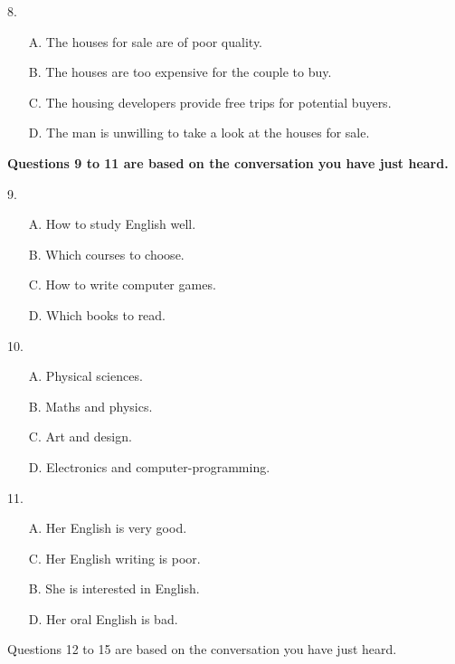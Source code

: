 \documentclass[UTF8,11pt]{ctexart}
\begin{document}
8.


\begin{itemize}[leftmargin=2em,itemsep=.2em,topsep=.4em]\item[A.] The houses for sale are of poor quality.
\item[B.] The houses are too expensive for the couple to buy.
\item[C.] The housing developers provide free trips for potential buyers.
\item[D.] The man is unwilling to take a look at the houses for sale.
\end{itemize}

\textbf{Questions 9 to 11 are based on the conversation you have just heard.}


9.


\begin{itemize}[leftmargin=2em,itemsep=.2em,topsep=.4em]\item[A.] How to study English well.
\item[B.] Which courses to choose.
\item[C.] How to write computer games.
\item[D.] Which books to read.
\end{itemize}

10.


\begin{itemize}[leftmargin=2em,itemsep=.2em,topsep=.4em]\item[A.] Physical sciences.
\item[B.] Maths and physics.
\item[C.] Art and design.
\item[D.] Electronics and computer-programming.
\end{itemize}

11.


\begin{itemize}[leftmargin=2em,itemsep=.2em,topsep=.4em]\item[A.] Her English is very good.
\item[C.] Her English writing is poor.
\end{itemize}

\begin{itemize}[leftmargin=2em,itemsep=.2em,topsep=.4em]\item[B.] She is interested in English.
\item[D.] Her oral English is bad.
\end{itemize}

Questions 12 to 15 are based on the conversation you have just heard.
\end{document}
